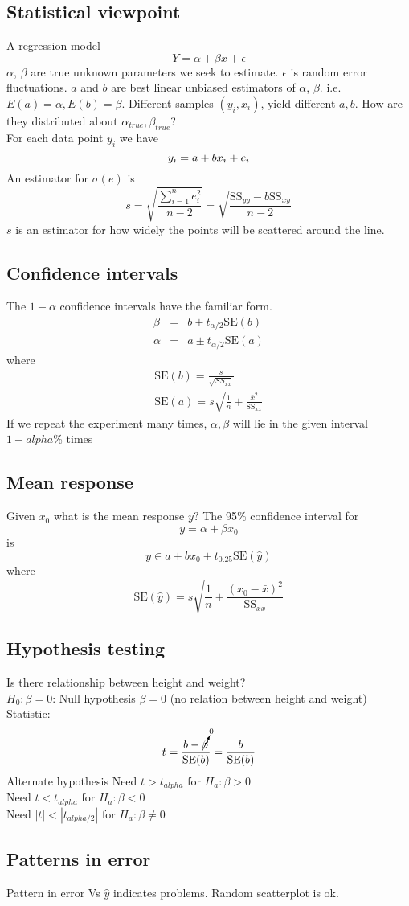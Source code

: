 \documentclass{article}
\newcommand{\beq}{\begin{equation}}
\newcommand{\eeq}{\end{equation}}
\newcommand{\ber}{\begin{eqnarray}}
\newcommand{\eer}{\end{eqnarray}}
\begin{document}
\subsection{Statistical viewpoint}
A regression model
\beq
Y = \alpha + \beta{x} + \epsilon
\eeq
$\alpha$, $\beta$ are true unknown parameters we seek to estimate. $\epsilon$ is random error fluctuations. $a$ and $b$ are best linear unbiased estimators of $\alpha$, $\beta$. i.e. $E(a)=\alpha, E(b)=\beta$. Different samples $(y_i,x_i)$, yield different $a,b$. How are they distributed about $\alpha_{true},\beta_{true}$?\\
For each data point $y_i$ we have
\beq
y_i = a + bx_i + e_i\\
\eeq
An estimator for $\sigma(e)$ is
\beq
s = \sqrt{\frac{\sum_{i=1}^{n}e_i^2}{n-2}} = \sqrt{\frac{\text{SS}_{yy}-b\text{SS}_{xy}}{n-2}}
\eeq
$s$ is an estimator for how widely the points will be scattered around the line.
\subsection{Confidence intervals}
The $1-\alpha$ confidence intervals have the familiar form.
\ber
\beta  &=& b \pm t_{\alpha/2}\text{SE}(b)\\
\alpha &=& a \pm t_{\alpha/2}\text{SE}(a)
\eer
where
\ber
\text{SE}(b) = \frac{s}{\sqrt{SS_{xx}}}\\
\text{SE}(a) = s\sqrt{\frac{1}{n} + \frac{\bar{x}^2}{\text{SS}_{xx}}}
\eer
If we repeat the experiment many times, $\alpha,\beta$ will lie in the given interval $1-alpha$\% times
\subsection{Mean response}
Given $x_0$ what is the mean response $y$? The 95\% confidence interval for
\beq
y = \alpha + \beta{}x_0
\eeq
is
\beq
y \in a + bx_0 \pm t_{0.25}\text{SE}(\hat{y})
\eeq
where
\beq
\text{SE}(\hat{y}) = s\sqrt{\frac{1}{n} + \frac{(x_0 - \bar{x})^2}{\text{SS}_{xx}}}
\eeq
\subsection{Hypothesis testing}
Is there relationship between height and weight?\\
$H_0:\beta=0$: Null hypothesis $\beta=0$ (no relation between height and weight)\\
Statistic:
\beq
t = \frac{b-\cancelto{0}{\beta}}{\text{SE}(b)} = \frac{b}{\text{SE}(b)}
\eeq
Alternate hypothesis
Need $t>t_{alpha}$ for $H_a: \beta>0$\\
Need $t<t_{alpha}$ for $H_a: \beta<0$\\
Need $|t|<|t_{alpha/2}|$ for $H_a: \beta\ne{0}$\\
\subsection{Patterns in error}
Pattern in error Vs $\hat{y}$ indicates problems. Random scatterplot is ok. 
\end{document}

